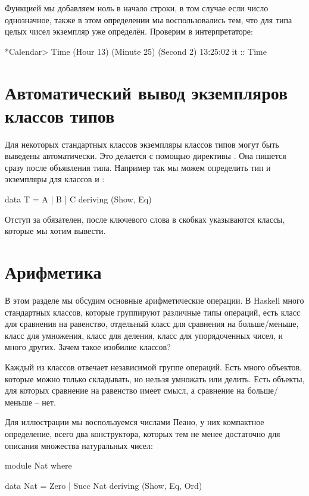 Функцией  мы добавляем ноль в начало строки, в том случае
если число однозначное, также в этом определении мы воспользовались тем,
что для типа целых чисел  экземпляр  уже определён.
Проверим в интерпретаторе:


\begin{code}
*Calendar> Time (Hour 13) (Minute 25) (Second 2)
13:25:02
it :: Time
\end{code}

\section{Автоматический вывод экземпляров классов типов}

Для некоторых стандартных классов экземпляры классов типов могут быть
выведены автоматически. Это делается с помощью директивы .
Она пишется сразу после объявления типа. Например так мы можем
определить тип и экземпляры для классов  и :


\begin{code}
data T = A | B | C
    deriving (Show, Eq)
\end{code}

Отступ за  обязателен, после ключевого слова в скобках
указываются классы, которые мы хотим вывести.

\section{Арифметика}

В этом разделе мы обсудим основные арифметические операции. В Haskell
много стандартных классов, которые группируют различные типы операций,
есть класс для сравнения на равенство, отдельный класс для сравнения на
больше/меньше, класс для умножения, класс для деления, класс для
упорядоченных чисел, и много других. Зачем такое изобилие классов?

Каждый из классов отвечает независимой группе операций. Есть много
объектов, которые можно только складывать, но нельзя умножать или
делить. Есть объекты, для которых сравнение на равенство имеет смысл, а
сравнение на больше/меньше -- нет.

Для иллюстрации мы воспользуемся числами Пеано, у них компактное
определение, всего два конструктора, которых тем не менее достаточно для
описания множества натуральных чисел:


\begin{code}
module Nat where

data Nat = Zero | Succ Nat
    deriving (Show, Eq, Ord)
\end{code}

